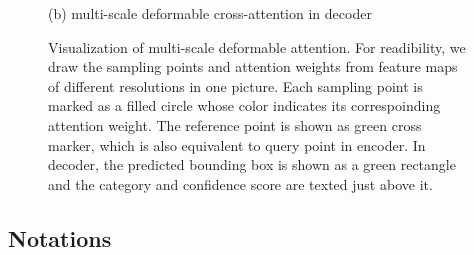 \documentclass{article}
\begin{document}
\begin{figure}[ht]
\centerline{(b) multi-scale deformable cross-attention in decoder}

\vspace{-0.3em}
\caption{Visualization of multi-scale deformable attention. For readibility, we draw the sampling points and attention weights from feature maps of different resolutions in one picture. Each sampling point is marked as a filled circle whose color indicates its correspoinding attention weight. The reference point is shown as green cross marker, which is also equivalent to query point in encoder. In decoder, the predicted bounding box is shown as a green rectangle and the category and confidence score are texted just above it. }
\vspace{-0.5em}
\label{fig:attn_viz}
\end{figure}

\clearpage

\subsection{Notations}
\end{document}
